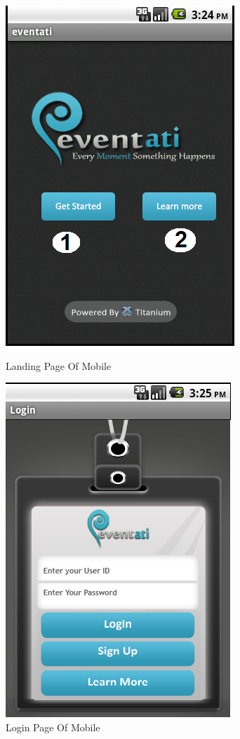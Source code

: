 \documentclass[12pt,a4paper,class,twoside,openany]{report}
\begin{document}
{\begin{figure}
	\begin{minipage}[b]{0.5\linewidth}
	\centering
	\includegraphics[height=4 in]{8-7}
	\caption{Landing Page Of Mobile }
     \label{fg:8-7}
	\end{minipage}
	\hspace{0.5cm}
	\begin{minipage}[b]{0.5\linewidth}
	\centering
	\includegraphics[width=\textwidth]{8-8}
	\caption{Login Page Of Mobile }
	\label{fg:8-8}
	\end{minipage}
	\end{figure}

}
\end{document}
